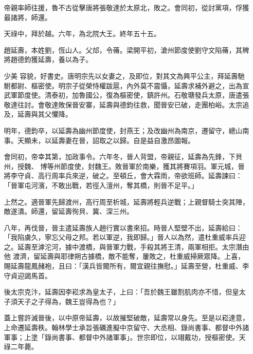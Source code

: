 \begin{pinyinscope}
 帝親率師往援，魯不古從擊唐將張敬達於太原北，敗之。會同初，從討黨項，俘獲最諸將，師還。



 天祿中，拜於越。六年，為北院大王。終年五十五。



 趙延壽，本姓劉，恆山人。父邟，令蓨。梁開平初，滄州節度使劉守文陷蓨，其稗將趙德鈞獲延壽，養以為子。



 少美
 容貌，好書史。唐明宗先以女妻之，及即位，對其文為興平公主，拜延壽馳駙都尉、樞密使。明宗子從榮恃權跋扈，內外莫不震懾，延壽求補外避之，出為宣武軍節度使。清泰初，加魯國公，復為樞密使，鎮許州。石敬瑭發兵太原，唐遣張敬達往討。會敬達敗保晉安寨，延壽與德鈞往救，聞晉安已破，走團柏峪。太宗追及，延壽與其父懼降。



 明年，德鈞卒，以延壽為幽州節度使，封燕王；及改幽州為南京，遷留守，總山南事。天顯未，以延壽妻在晉，詔取之以歸。自是益自激昂圖報。



 會同初，帝幸其第，加政事令。六年冬，晉人背盟，帝親征，延壽為先鋒，下貝州，授魏、
 博等州節度使，封魏王。敗晉軍於南樂，獲其將賽項羽。軍元城，晉將李守貞、高行周率兵來逆，破之。至頓丘，會大霖雨，帝欲班師。延壽諫曰：「晉軍屯河濱，不敢出戰，若徑入澶州，奪其橋，則晉不足平。」



 上然之。適晉軍先歸渡州，高行周至析城，延壽將輕兵逆戰；上親督騎士突其陣，敵遂潰。師還，留延壽徇貝、冀、深三州。



 八年，再伐晉，晉主遣延壽族人趙行實以書來招。時晉人堅壁不出，延壽給曰：「我陷虜久，寧忘父母之邦。若以軍逆，我即歸。」晉人以為然，遣杜重威率兵迎之。延壽至滹沱河，據中渡橋，與晉軍力戰，手殺其將王清，兩軍相拒。太宗潛由他
 渡濟，留延壽與耶律朔古據橋，敵不能奪，屢敗之，杜重威掃厥眾降。上喜，賜延壽龍鳳赭袍，且曰：「漢兵皆爾所有，爾宜親往撫慰。」延壽至營，杜重威、李守貞迎謁馬首。



 後太宗克汴，延壽因李崧求為皇太子，上曰：「吾於魏王雖割肌肉亦不惜，但皇太子須天子之子得為，魏王豈得為也？」



 蓋上嘗許滅晉後，以中原帝延壽，以故摧堅破敵，延壽常以身先。至是以崧達意，上命遷延壽秩。翰林學士承旨張礪進擬中京留守、大丞相、錄尚書事、都督中外諸軍事；上塗「錄尚書事、都督中外諸軍事」。世宗即位，以翊戴功，授樞密使。天祿二年薨。




\end{pinyinscope}
